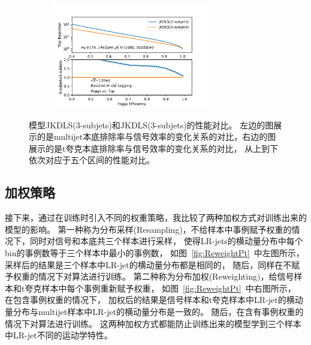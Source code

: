 \begin{figure}[htbp]
\begin{subfigure}{.5\textwidth}
     \caption{}
  \end{subfigure}
  \begin{subfigure}{.5\textwidth}
  \centering
   \includegraphics[width=0.75\textwidth]{figuresXbb/Subjet/SUBTopMASSPT3.pdf}
     \caption{}
  \end{subfigure}
  \caption{
 模型JKDLS(3-subjets)和JKDLS(3-subjets)的性能对比。
左边的图展示的是multijet本底排除率与信号效率的变化关系的对比，右边的图展示的是t夸克本底排除率与信号效率的变化关系的对比，
从上到下依次对应于五个区间的性能对比。
  }
  \label{fig:SubjetROC}
\end{figure} 


\subsection{加权策略}
\label{sec:XbbTagger3}

接下来，通过在训练时引入不同的权重策略，我比较了两种加权方式对训练出来的模型的影响。
第一种称为分布采样(Resampling)，不给样本中事例赋予权重的情况下，同时对信号和本底共三个样本进行采样，
使得LR-jets的横动量分布中每个bin的事例数等于三个样本中最小的事例数，
如图~\ref{fig:ReweightPt}~中左图所示，采样后的结果是三个样本中LR-jet的横动量分布都是相同的，
随后，同样在不赋予权重的情况下对算法进行训练。
第二种称为分布加权(Reweighting)，给信号样本和t夸克样本中每个事例重新赋予权重，
如图~\ref{fig:ReweightPt}~中右图所示，
在包含事例权重的情况下，
加权后的结果是信号样本和t夸克样本中LR-jet的横动量分布与multijet样本中LR-jet的横动量分布是一致的。
随后，在含有事例权重的情况下对算法进行训练。
这两种加权方式都能防止训练出来的模型学到三个样本中LR-jet不同的运动学特性。

